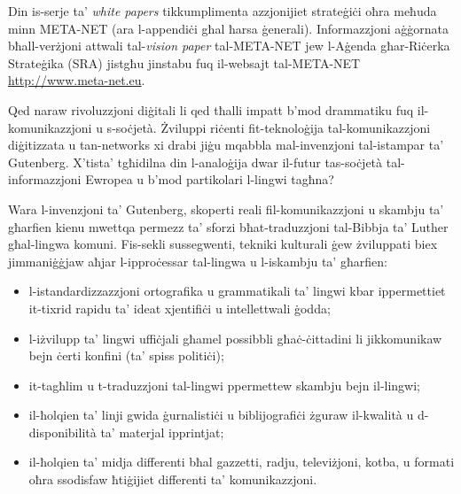 \documentclass[]{../../metanetpaper}
\begin{document}
\begin{multicols}{2}
Din is-serje ta’ \emph{white papers} tikkumplimenta azzjonijiet strateġiċi oħra meħuda minn META-NET (ara l-appendiċi għal ħarsa ġenerali). Informazzjoni aġġornata bħall-verżjoni attwali tal-\emph{vision paper} \cite{Meta1}  tal-META-NET jew l-Aġenda għar-Riċerka Strateġika (SRA) jistgħu jinstabu fuq il-websajt tal-META-NET \url{http://www.meta-net.eu}.

\end{multicols}

\clearpage



\begin{multicols}{2}

Qed naraw rivoluzzjoni diġitali li qed tħalli impatt b’mod drammatiku fuq il-komunikazzjoni u s-soċjetà. Żviluppi riċenti fit-teknoloġija tal-komunikazzjoni diġitizzata u tan-networks xi drabi jiġu mqabbla mal-invenzjoni tal-istampar ta’ Gutenberg. X’tista’ tgħidilna din l-analoġija dwar il-futur tas-soċjetà tal-informazzjoni Ewropea u b’mod partikolari l-lingwi tagħna?

   
Wara l-invenzjoni ta’ Gutenberg, skoperti reali fil-komunikazzjoni u skambju ta’ għarfien kienu mwettqa permezz ta’ sforzi bħat-traduzzjoni tal-Bibbja ta’ Luther għal-lingwa komuni. Fis-sekli sussegwenti, tekniki kulturali ġew żviluppati biex jimmaniġġjaw aħjar l-ipproċessar tal-lingwa u l-iskambju ta’ għarfien:

\begin{itemize}
\item l-istandardizzazzjoni ortografika u grammatikali ta’ lingwi kbar ippermettiet it-tixrid rapidu ta’ ideat xjentifiċi u intellettwali ġodda;
\item l-iżvilupp ta’ lingwi uffiċjali għamel possibbli għaċ-ċittadini li jikkomunikaw bejn ċerti konfini (ta’ spiss politiċi);
\item it-tagħlim u t-traduzzjoni tal-lingwi ppermettew skambju bejn il-lingwi;
\item il-ħolqien ta’ linji gwida ġurnalistiċi u biblijografiċi żguraw il-kwalità u d-disponibilità ta’ materjal ipprintjat;
\item il-ħolqien ta’ midja differenti bħal gazzetti, radju, televiżjoni, kotba, u formati oħra ssodisfaw ħtiġijiet differenti ta’ komunikazzjoni.
\end{itemize}


\end{multicols}
\end{document}
